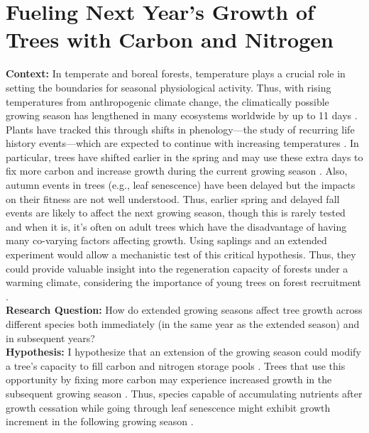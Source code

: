 \documentclass{article}
\begin{document}
\section*{Fueling Next Year's Growth of Trees with Carbon and Nitrogen}
\textbf {Context:}
In temperate and boreal forests, temperature plays a crucial role in setting the boundaries for seasonal physiological activity. Thus, with rising temperatures from anthropogenic climate change, the climatically possible growing season has lengthened in many ecosystems worldwide by up to 11 days \citep{korner_phenology_2010, menzel_growing_1999}. Plants have tracked this through shifts in phenology—the study of recurring life history events—which are expected to continue with increasing temperatures \citep{wolkovich_warming_2012}. In particular, trees have shifted earlier in the spring and may use these extra days to fix more carbon and increase growth during the current growing season \citep{keenan_net_2014, wang_interactive_2020}. Also, autumn events in trees (e.g., leaf senescence) have been delayed but the impacts on their fitness are not well understood. Thus, earlier spring and delayed fall events are likely to affect the next growing season, though this is rarely tested and when it is, it's often on adult trees which have the disadvantage of having many co-varying factors affecting growth. Using saplings and an extended experiment would allow a mechanistic test of this critical hypothesis. Thus, they could provide valuable insight into the regeneration capacity of forests under a warming climate, considering the importance of young trees on forest recruitment \citep{zohner_how_2021}. \\  %
\textbf {Research Question:} How do extended growing seasons affect tree growth across different species both immediately (in the same year as the extended season) and in subsequent years? \\
\textbf {Hypothesis:} I hypothesize that an extension of the growing season could modify a tree’s capacity to fill carbon and nitrogen storage pools \citep{chapin_ecology_1990, lawrence_variable_2018}. Trees that use this opportunity by fixing more carbon may experience increased growth in the subsequent growing season \citep{landhausser_partitioning_2012, martens_first-year_2007}. Thus, species capable of accumulating nutrients after growth cessation while going through leaf senescence might exhibit growth increment in the following growing season \citep{schott_premature_2013}. \\
\end{document}
